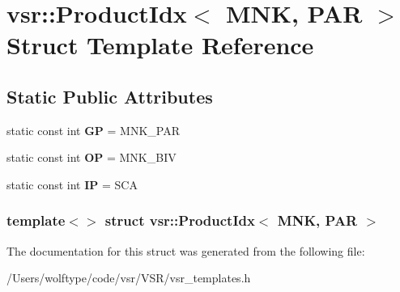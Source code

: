 \hypertarget{structvsr_1_1_product_idx_3_01_m_n_k_00_01_p_a_r_01_4}{\section{vsr\-:\-:Product\-Idx$<$ M\-N\-K, P\-A\-R $>$ Struct Template Reference}
\label{structvsr_1_1_product_idx_3_01_m_n_k_00_01_p_a_r_01_4}
}
\subsection*{Static Public Attributes}
\begin{DoxyCompactItemize}
\item 
\hypertarget{structvsr_1_1_product_idx_3_01_m_n_k_00_01_p_a_r_01_4_a5ba19a9cfbff82a807aca03f27227c4e}{static const int {\bfseries G\-P} = M\-N\-K\-\_\-\-P\-A\-R}\label{structvsr_1_1_product_idx_3_01_m_n_k_00_01_p_a_r_01_4_a5ba19a9cfbff82a807aca03f27227c4e}

\item 
\hypertarget{structvsr_1_1_product_idx_3_01_m_n_k_00_01_p_a_r_01_4_a240e8e77bc9f03217a25f5127eb771d8}{static const int {\bfseries O\-P} = M\-N\-K\-\_\-\-B\-I\-V}\label{structvsr_1_1_product_idx_3_01_m_n_k_00_01_p_a_r_01_4_a240e8e77bc9f03217a25f5127eb771d8}

\item 
\hypertarget{structvsr_1_1_product_idx_3_01_m_n_k_00_01_p_a_r_01_4_a97d2609be82675d01de009e47cbbc525}{static const int {\bfseries I\-P} = S\-C\-A}\label{structvsr_1_1_product_idx_3_01_m_n_k_00_01_p_a_r_01_4_a97d2609be82675d01de009e47cbbc525}

\end{DoxyCompactItemize}
\subsubsection*{template$<$$>$ struct vsr\-::\-Product\-Idx$<$ M\-N\-K, P\-A\-R $>$}



The documentation for this struct was generated from the following file\-:\begin{DoxyCompactItemize}
\item 
/\-Users/wolftype/code/vsr/\-V\-S\-R/vsr\-\_\-templates.\-h\end{DoxyCompactItemize}
